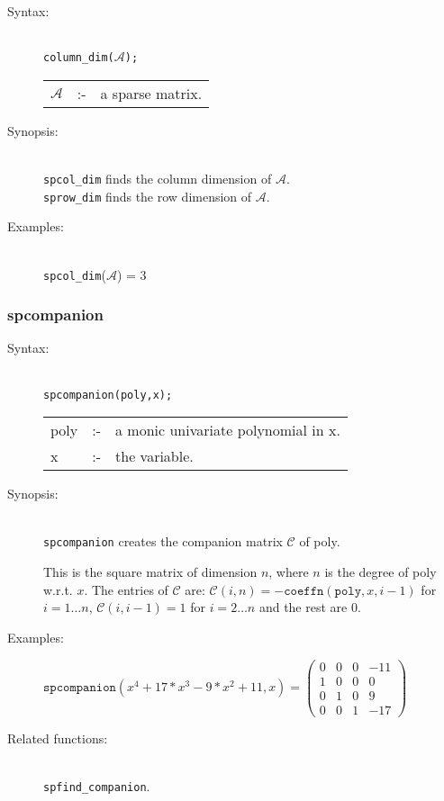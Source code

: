 \begin{description}
\item[Syntax:]\mbox{}\\
\texttt{column\_dim($\mathcal{A}$);}\\[2mm]
\begin{tabular}{l l l}
$\mathcal{A}$ &:-& a sparse matrix.
\end{tabular}

\item[Synopsis:]\mbox{}\\
\texttt{spcol\_dim} finds the column dimension of 
                $\mathcal{A}$. \\
\texttt{sprow\_dim} finds the row dimension of $\mathcal{A}$.

\item[Examples:]\mbox{}\\
\texttt{spcol\_dim}($\mathcal{A}$) = 3
\end{description}

\subsubsection{spcompanion}
\label{sparse:spcompanion}

\begin{description}
\item[Syntax:]\mbox{}\\
\texttt{spcompanion(poly,x);}\\[2mm]
\begin{tabular}{l l l}
poly &:-& a monic univariate polynomial in x. \\
x    &:-& the variable.
\end{tabular}

\item[Synopsis:]\mbox{}\\
                \texttt{spcompanion} creates the companion matrix $\mathcal{C}$
                of poly. 

This is the square matrix of dimension $n$, where $n$ is the degree of poly 
w.r.t. $x$.
The entries of $\mathcal{C}$ are: 
                $\mathcal{C}(i,n) = -\texttt{coeffn}(\texttt{poly},x,i-1)$ for $i = 1 
                \ldots n$, $\mathcal{C}(i,i-1) = 1$ for $i = 2 \ldots n$ and 
                the rest are $0$.

\item[Examples:]
\begin{flushleft}  
\begin{math}  
\texttt{spcompanion}(x^4+17*x^3-9*x^2+11,x) = 
\begin{pmatrix}
  0 & 0 & 0 & -11 \\ 1 & 0 & 0 & 0 \\ 0 & 1 & 0 & 9 \\ 0 & 0 & 1 & -17 
\end{pmatrix} 
\end{math}  
\end{flushleft}

\item[Related functions:]\mbox{}\\
\texttt{spfind\_companion}.
\end{description}

